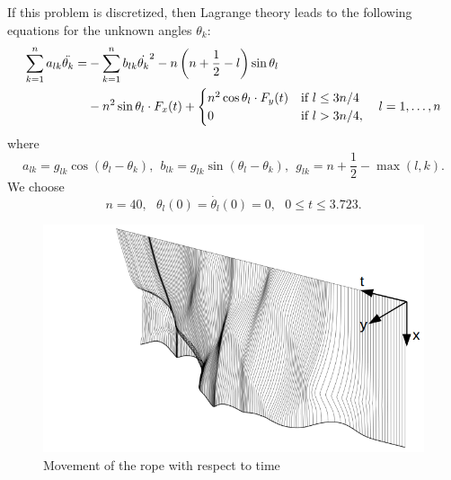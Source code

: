 \documentclass[notitlepage,12pt]{article}
\begin{document}
If this problem is discretized, then Lagrange theory leads to the following equations for the unknown angles $\theta_k$:
\begin{equation}
\begin{aligned}
\sum _{k=1}^n a_{lk} \ddot{\theta_k} = &-\sum _{k=1}^n b_{lk} \dot{\theta_k}^2 -n\left(n+\frac{1}{2} -l \right)\sin{\theta_l}\\
&-n^2\sin{\theta_l}\cdot F_x(t) + \begin{cases}
               n^2\cos{\theta_l}\cdot F_y(t) &\textnormal{if}\ l\leq 3n/4\\
               0 &\textnormal{if}\ l > 3n/4,
            \end{cases} \ \ \  l = 1,\ldots,n
\end{aligned}
\end{equation}
where
\begin{equation}
	a_{lk} = g_{lk}\cos{(\theta_l -\theta_k)}, \ \ b_{lk} = g_{lk}\sin{(\theta_l -\theta_k)},\ \ g_{lk} = n+\frac{1}{2} - \max{(l,k)}.
\end{equation}
We choose
\begin{equation}
	n=40, \ \ \ \theta_l(0) = \dot{\theta_l}(0) = 0, \ \ \ 0 \leq t \leq 3.723.
\end{equation}

\begin{figure}[H]
\centering
\includegraphics[scale=0.70]{../ImagesAndPDFs/Plots/RopePlot.png}
\caption{Movement of the rope with respect to time}
\label{fig:rope}
\end{figure}

\newpage
\end{document}
